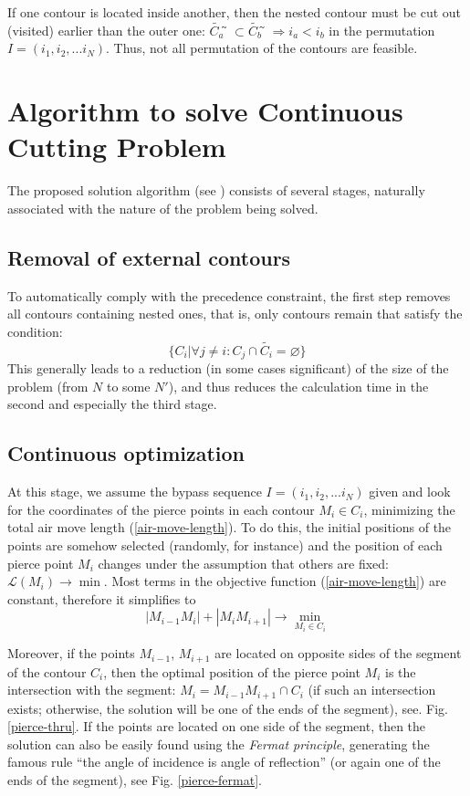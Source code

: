 \documentclass[]{llncs}
\begin{document}
If one contour is located inside another,
then the nested contour must be cut out
(visited)
earlier than the outer one:
$\tilde{C_a} ̃\subset \tilde{C_b} ̃\Rightarrow i_a < i_b$
in the permutation
$I = (i_1, i_2, ... i_N)$.
Thus, not all permutation of the contours are feasible.

\section{Algorithm to solve Continuous Cutting Problem}

The proposed solution algorithm
(see \cite{berlin2019})
consists of several stages,
naturally associated with the nature of the problem being solved.

\subsection{Removal of external contours}

To automatically comply with the precedence constraint,
the first step removes all contours containing nested ones,
that is, only contours remain that satisfy the condition:
$$
\{C_i | \forall j \ne i: C_j \cap \tilde{C_i} = \varnothing \}
$$
This generally leads to a reduction
(in some cases significant)
of the size of the problem
(from $N$ to some $N'$),
and thus reduces the calculation time
in the second and especially the third stage.

\subsection{Continuous optimization}

At this stage,
we assume the bypass sequence
$I = (i_1, i_2, ... i_N)$
given and look for the coordinates of the pierce points
in each contour
$M_i \in C_i$,
minimizing the total air move length (\ref{air-move-length}).
To do this, the initial positions of the points are somehow selected
(randomly, for instance)
and the position of each pierce point $M_i$
changes under the assumption that others are fixed:
$\mathcal{L}(M_i) \to \min$.
Most terms in the objective function
(\ref{air-move-length})
are constant, therefore it simplifies to
$$
|M_{i-1}M_i|+|M_iM_{i+1}| \to \min_{M_i \in C_i}
$$

Moreover,
if the points
$M_{i-1}$,
$M_{i + 1}$
are located on opposite sides of the segment of the contour
$C_i$,
then the optimal position of the
pierce point $M_i$ is the intersection with the segment:
$M_i = M_{i-1} M_{i + 1} \cap C_i$
(if such an intersection exists;
otherwise,
the solution will be one of the ends of the segment),
see. Fig. \ref{pierce-thru}.
If the points are located on one side of the segment,
then the solution can also be easily found using the
\textit{Fermat principle},
generating the famous rule
``the angle of incidence is angle of reflection''
(or again one of the ends of the segment),
see Fig. \ref{pierce-fermat}.
\end{document}
